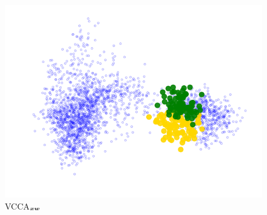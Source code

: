 \hfill
\begin{subfigure}[b]{0.3\textwidth}
	\centering
	\includegraphics[width=\textwidth]{Chapter1/pics_paperB/pca_latents_juice_yoghurt_vcca_xw_seed2}
	\vspace{-8mm}
	\caption{VCCA$_{{\bm{x}}{\bm{w}}}$}
	\label{fig:pca_latents_vcca_xw_juice_yoghurt}
\end{subfigure}